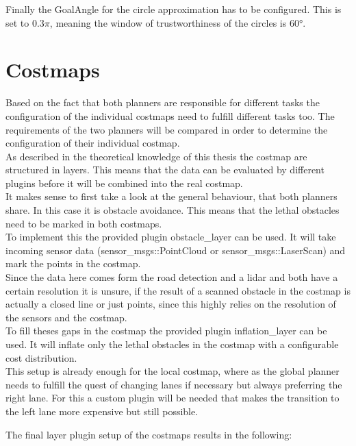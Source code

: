 Finally the GoalAngle for the circle approximation has to be configured. This is set to $0.3\pi$, meaning the window of trustworthiness of the circles is 60°.




\section{Costmaps}
Based on the fact that both planners are responsible for different tasks the configuration of the individual costmaps need to fulfill different tasks too. The requirements of the two planners will be compared in order to determine the configuration of their individual costmap.\\

As described in the theoretical knowledge of this thesis the costmap are structured in layers. This means that the data can be evaluated by different plugins before it will be combined into the real costmap.\\

It makes sense to first take a look at the general behaviour, that both planners share. In this case it is obstacle avoidance. This means that the lethal obstacles need to be marked in both costmaps.\\

To implement this the provided plugin obstacle\_layer can be used. It will take incoming sensor data (sensor\_msgs::PointCloud or sensor\_msgs::LaserScan) and mark the points in the costmap.\\

Since the data here comes form the road detection and a lidar and both have a certain resolution it is unsure, if the result of a scanned obstacle in the costmap is actually a closed line or just points, since this highly relies on the resolution of the sensors and the costmap.\\

To fill theses gaps in the costmap the provided plugin inflation\_layer can be used. It will inflate only the lethal obstacles in the costmap with a configurable cost distribution.\\

This setup is already enough for the local costmap, where as the global planner needs to fulfill the quest of changing lanes if necessary but always preferring the right lane. For this a custom plugin will be needed that makes the transition to the left lane more expensive but still possible.


The final layer plugin setup of the costmaps results in the following:\\

